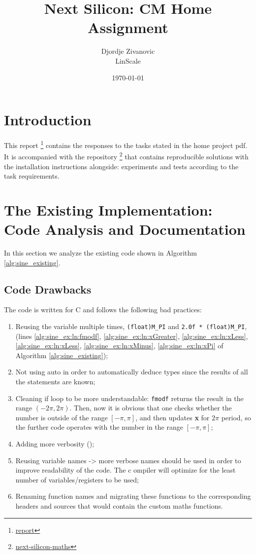 \documentclass[12pt]{article}
\title{Next Silicon: CM Home Assignment}
\author{Djordje Zivanovic \\ \small{LinScale}}
\date{\today}
\begin{document}
\maketitle
\tableofcontents
\newpage

\section{Introduction}
This report \footnote{\href{https://github.com/popina1994/Next-Silicon-Report}{report}} contains the responses to the tasks stated in the home project pdf.
It is accompanied with the repository \footnote{\href{https://github.com/popina1994/next-silicon-maths}{next-silicon-maths}} that contains reproducible solutions with the installation instructions alongside: experiments and tests according to the task requirements.
\section{The Existing Implementation: Code Analysis and Documentation}
In this section we analyze the existing code shown in Algorithm \ref{alg:sine_existing}.

\subsection{Code Drawbacks}
The code is written for C and follows the following bad practices:
\begin{enumerate}
    \item Reusing the variable multiple times,  \texttt{(float)M\_PI} and \texttt{2.0f * (float)M\_PI}, (lines \ref{alg:sine_ex:ln:fmodf}, \ref{alg:sine_ex:ln:xGreater}, \ref{alg:sine_ex:ln:xLess}, \ref{alg:sine_ex:ln:xLess}, \ref{alg:sine_ex:ln:xMinus}, \ref{alg:sine_ex:ln:xPi} of Algorithm \ref{alg:sine_existing});
    \item Not using auto in order to automatically deduce types since the results of all the statements are known;
    \item Cleaning if loop to be more understandable: \texttt{fmodf} returns the result in the range $(-2 \pi, 2 \pi)$. Then, now it is obvious that one checks whether the number is outside of the range $[-\pi, \pi]$, and then updates \textbf{x} for $2 \pi$ period, so the further code operates with the number in the range $[-\pi, \pi]$;
    \item Adding more verbosity ();
    \item Reusing variable names -> more verbose names should be used in order to improve readability of the code. The c ompiler will optimize for the least number of variables/registers to be used;
    \item Renaming function names and migrating these functions to the corresponding headers and sources that would contain the custom maths functions.
\end{enumerate}
\end{document}
